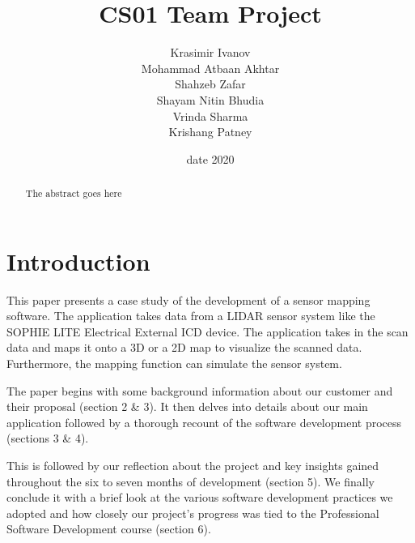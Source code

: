 \documentclass{l3proj}
\begin{document}
\title{CS01 Team Project}

    \author{Krasimir Ivanov\\
        Mohammad Atbaan Akhtar \\
        Shahzeb Zafar \\
        Shayam Nitin Bhudia \\
        Vrinda Sharma\\ 
        Krishang Patney\\}

\date{date 2020}

\maketitle

\begin{abstract}

The abstract goes here

\end{abstract}

\educationalconsent

\newpage

\section{Introduction}

This paper presents a case study of the development of a sensor mapping software. The application takes data from a LIDAR sensor system like the SOPHIE LITE Electrical External ICD device. The application takes in the scan data and maps it onto a 3D or a 2D map to visualize the scanned data. Furthermore, the mapping function can simulate the sensor system.

The paper begins with some background information about our customer and their proposal (section 2 \& 3). It then delves into details about our main application followed by a thorough recount of the software development process (sections 3 \& 4). 

This is followed by our reflection about the project and key insights gained throughout the six to seven months of development (section 5). We finally conclude it with a brief look at the various software development practices we adopted and how closely our project’s progress was tied to the Professional Software Development course (section 6).
\end{document}
